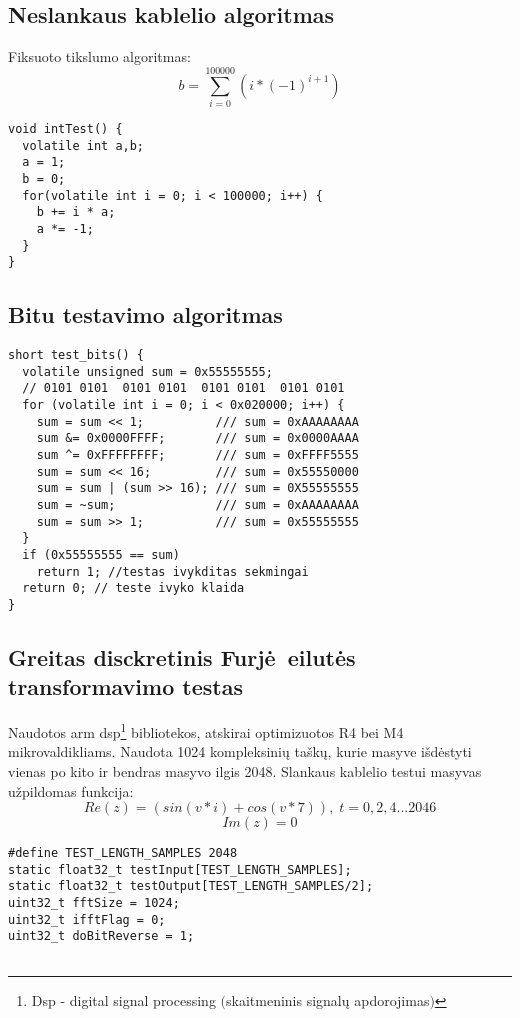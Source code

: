 \documentclass[a4paper, 12pt]{article} %
\begin{document}
\begin{onehalfspacing}
\subsection{Neslankaus kablelio algoritmas}
Fiksuoto tikslumo algoritmas:
\begin{equation}
b = \sum_{i=0}^{100000} (i * (-1)^{i+1})
\end{equation}

\begin{verbatim}
void intTest() {
  volatile int a,b;
  a = 1;
  b = 0;
  for(volatile int i = 0; i < 100000; i++) {
    b += i * a;
    a *= -1;
  }
}
\end{verbatim}
\subsection{Bitu testavimo algoritmas}
\begin{verbatim}
short test_bits() {
  volatile unsigned sum = 0x55555555; 
  // 0101 0101  0101 0101  0101 0101  0101 0101  
  for (volatile int i = 0; i < 0x020000; i++) {
    sum = sum << 1;          /// sum = 0xAAAAAAAA 
    sum &= 0x0000FFFF;       /// sum = 0x0000AAAA
    sum ^= 0xFFFFFFFF;       /// sum = 0xFFFF5555
    sum = sum << 16;         /// sum = 0x55550000
    sum = sum | (sum >> 16); /// sum = 0X55555555
    sum = ~sum;              /// sum = 0xAAAAAAAA
    sum = sum >> 1;          /// sum = 0x55555555
  }
  if (0x55555555 == sum)
    return 1; //testas ivykditas sekmingai
  return 0; // teste ivyko klaida
}
\end{verbatim}
\subsection{Greitas disckretinis Furj\.e\ eilut\.es transformavimo testas}
Naudotos arm dsp\footnote{Dsp - digital signal processing $($skaitmeninis signal\k{u} apdorojimas$)$} bibliotekos, atskirai optimizuotos R4 bei M4 mikrovaldikliams. Naudota 1024 kompleksini\k{u} ta\v{s}k\k{u}, kurie masyve i\v{s}d\.estyti vienas po kito ir bendras masyvo ilgis 2048. Slankaus kablelio testui masyvas u\v{z}pildomas funkcija:
\begin{equation*}
Re(z) = (sin(v*i) + cos(v*7)),\; t = 0, 2, 4... 2046
\end{equation*}
\begin{equation}
Im(z) = 0
\end{equation}
\begin{verbatim}
#define TEST_LENGTH_SAMPLES 2048 
static float32_t testInput[TEST_LENGTH_SAMPLES]; 
static float32_t testOutput[TEST_LENGTH_SAMPLES/2]; 
uint32_t fftSize = 1024; 
uint32_t ifftFlag = 0; 
uint32_t doBitReverse = 1; 


\end{verbatim}
\end{onehalfspacing}
\end{document}
